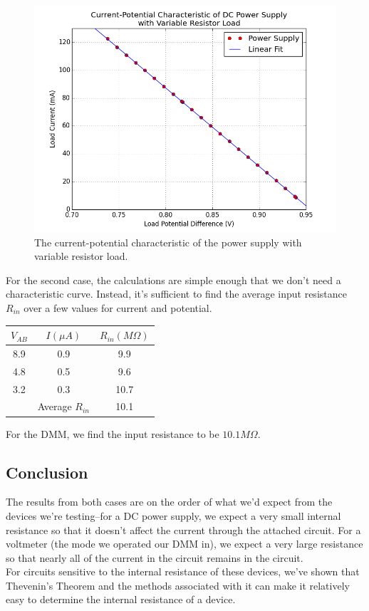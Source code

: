 \documentclass[11pt]{article}
\begin{document}
    \begin{figure}[H]
        \centering
        \includegraphics[width=\textwidth]{fig_PowerSupply.png}
        \caption{The current-potential characteristic of the power supply with variable resistor load.}
        \label{fig:powerSupply}
    \end{figure}

    For the second case, the calculations are simple enough that we don't need a characteristic curve. Instead, it's sufficient to find the average input resistance \(R_{in}\) over a few values for current and potential.\\

    \begin{center}
        \begin{tabular}{ |c|c|c| }
            \( V_{AB} \) & \( I (\mu A) \) & \( R_{in} (M\Omega) \) \\
            \hline
            8.9 & 0.9 & 9.9 \\
            \hline
            4.8 & 0.5 & 9.6 \\
            \hline
            3.2 & 0.3 & 10.7 \\
            \hline
            \hline
            & Average \( R_{in} \) & 10.1
        \end{tabular}
    \end{center}

    For the DMM, we find the input resistance to be $10.1 M\Omega$. \\

\subsection{Conclusion}
    The results from both cases are on the order of what we’d expect from the devices we’re testing--for a DC power supply, we expect a very small internal resistance so that it doesn’t affect the current through the attached circuit. For a voltmeter (the mode we operated our DMM in), we expect a very large resistance so that nearly all of the current in the circuit remains in the circuit. \\
    
    For circuits sensitive to the internal resistance of these devices, we’ve shown that Thevenin’s Theorem and the methods associated with it can make it relatively easy to determine the internal resistance of a device. 
\end{document}
